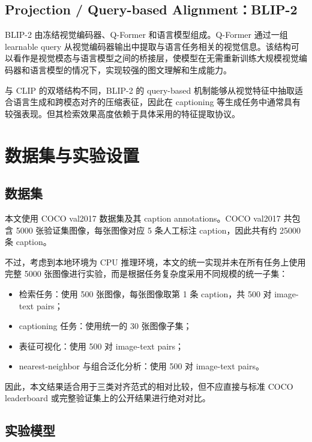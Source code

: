 \documentclass[UTF8,a4paper,10pt]{ctexart}
\begin{document}
\subsection{Projection / Query-based Alignment：BLIP-2}

BLIP-2 由冻结视觉编码器、Q-Former 和语言模型组成。Q-Former 通过一组 learnable query 从视觉编码器输出中提取与语言任务相关的视觉信息。该结构可以看作是视觉模态与语言模型之间的桥接层，使模型在无需重新训练大规模视觉编码器和语言模型的情况下，实现较强的图文理解和生成能力。

与 CLIP 的双塔结构不同，BLIP-2 的 query-based 机制能够从视觉特征中抽取适合语言生成和跨模态对齐的压缩表征，因此在 captioning 等生成任务中通常具有较强表现。但其检索效果高度依赖于具体采用的特征提取协议。

\section{数据集与实验设置}

\subsection{数据集}

本文使用 COCO val2017 数据集及其 caption annotations。COCO val2017 共包含 5000 张验证集图像，每张图像对应 5 条人工标注 caption，因此共有约 25000 条 caption。

不过，考虑到本地环境为 CPU 推理环境，本文的统一实现并未在所有任务上使用完整 5000 张图像进行实验，而是根据任务复杂度采用不同规模的统一子集：

\begin{itemize}
    \item 检索任务：使用 500 张图像，每张图像取第 1 条 caption，共 500 对 image-text pairs；
    \item captioning 任务：使用统一的 30 张图像子集；
    \item 表征可视化：使用 500 对 image-text pairs；
    \item nearest-neighbor 与组合泛化分析：使用 500 对 image-text pairs。
\end{itemize}

因此，本文结果适合用于三类对齐范式的相对比较，但不应直接与标准 COCO leaderboard 或完整验证集上的公开结果进行绝对对比。

\subsection{实验模型}
\end{document}
